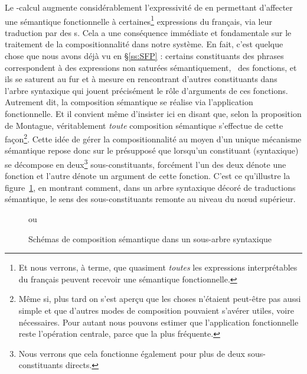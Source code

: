 Le \lamb-calcul augmente considérablement l'expressivité de {\LO} en
permettant d'affecter une sémantique fonctionnelle à
certaines\footnote{Et nous verrons, à terme, que quasiment
  \emph{toutes} les expressions interprétables du français peuvent
  recevoir une sémantique fonctionnelle.}  expressions du français,
via leur traduction par des \lterme s.  Cela a une conséquence
immédiate et fondamentale 
sur le traitement de la
compositionnalité dans notre système. 
En fait, c'est quelque chose que nous avons déjà vu en \S\ref{ss:SFP} :
certains constituants des phrases correspondent à des expressions non saturées
sémantiquement, \ie\ des fonctions, et ils se saturent au fur et à
mesure en rencontrant d'autres constituants dans l'arbre syntaxique
qui jouent précisément le rôle d'arguments de ces fonctions. Autrement
dit, la composition sémantique  se réalise
via  l'application fonctionnelle.  
Et il convient même d'insister ici en disant que, selon la proposition
de Montague,  
véritablement \emph{toute} composition sémantique
s'effectue  de cette façon\footnote{Même si, plus tard
  on s'est aperçu que les choses n'étaient peut-être pas aussi simple
  et que d'autres modes de composition pouvaient s'avérer utiles,
  voire nécessaires. Pour autant nous pouvons estimer que l'application
  fonctionnelle reste l'opération centrale, parce que la plus fréquente.}.
Cette idée de gérer la
compositionnalité au moyen d'un unique mécanisme sémantique
repose donc sur le présupposé que lorsqu'un constituant
(syntaxique) se décompose en deux\footnote{Nous verrons que cela
  fonctionne également pour plus de deux sous-constituants directs.}
 sous-constituants, forcément l'un des deux
dénote une fonction et l'autre dénote un argument de cette fonction.
C'est ce qu'illustre la figure~\ref{f:schemcompsem}, en montrant
comment, dans un arbre syntaxique décoré de traductions sémantique, le
sens des sous-constituants 
remonte au niveau du n\oe ud supérieur.

\begin{figure}[h]
\begin{center} 
{\large
{}  
}
\qquad\qquad
ou
\qquad
{\large
{}  
}
\caption{Schémas de composition sémantique dans un sous-arbre syntaxique}\label{f:schemcompsem}
\end{center}
\end{figure}


